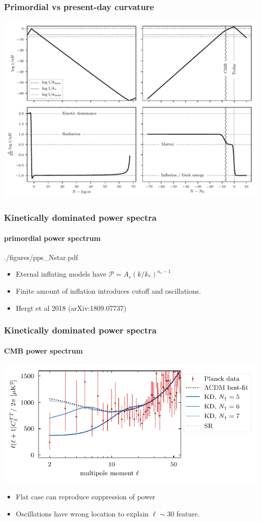 \documentclass[%
]{beamer}
\begin{document}
\begin{frame}
    \frametitle{Primordial vs present-day curvature}
    \includegraphics[width=\textwidth]{./figures/horizon_history.pdf}
\end{frame}

\begin{frame}
    \frametitle{Kinetically dominated power spectra}
    \framesubtitle{primordial power spectrum}
    \begin{figright}[0.3]{./figures/pps_Nstar.pdf}
        \begin{itemize}
            \item Eternal inflating models have $\mathcal{P} = A_s {\left(k/k_*\right)}^{n_s-1}$
            \item Finite amount of inflation introduces cutoff and oscillations. 
            \item Hergt et al 2018 (arXiv:1809.07737)
        \end{itemize}
    \end{figright}
\end{frame}

\begin{frame}
    \frametitle{Kinetically dominated power spectra}
    \framesubtitle{CMB power spectrum}
    \includegraphics[width=\textwidth]{./figures/cmb_KD_Ndagg.pdf}
    \begin{itemize}
        \item Flat case can reproduce suppression of power
        \item Oscillations have wrong location to explain $\ell \sim 30$ feature.
    \end{itemize}
\end{frame}
\end{document}
